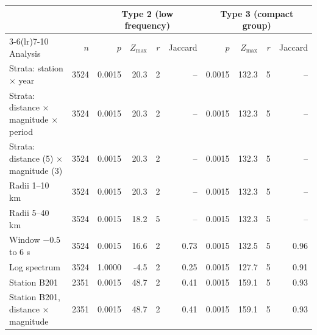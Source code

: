 \begin{tabular}{@{}lrrrrrrrrr@{}}
\toprule
 & & \multicolumn{4}{c}{Type 2 (low frequency)} & \multicolumn{4}{c}{Type 3 (compact group)} \\
\cmidrule(lr){3-6}\cmidrule(lr){7-10}
Analysis & $n$ & $p$ & $Z_{\max}$ & $r$ & Jaccard & $p$ & $Z_{\max}$ & $r$ & Jaccard \\
\midrule
Strata: station $\times$ year & 3524 & 0.0015 & 20.3 & 2 & -- & 0.0015 & 132.3 & 5 & -- \\
Strata: distance $\times$ magnitude $\times$ period & 3524 & 0.0015 & 20.3 & 2 & -- & 0.0015 & 132.3 & 5 & -- \\
Strata: distance (5) $\times$ magnitude (3) & 3524 & 0.0015 & 20.3 & 2 & -- & 0.0015 & 132.3 & 5 & -- \\
Radii 1--10 km & 3524 & 0.0015 & 20.3 & 2 & -- & 0.0015 & 132.3 & 5 & -- \\
Radii 5--40 km & 3524 & 0.0015 & 18.2 & 5 & -- & 0.0015 & 132.3 & 5 & -- \\
Window $-0.5$ to $6$ s & 3524 & 0.0015 & 16.6 & 2 & 0.73 & 0.0015 & 132.5 & 5 & 0.96 \\
Log spectrum & 3524 & 1.0000 & -4.5 & 2 & 0.25 & 0.0015 & 127.7 & 5 & 0.91 \\
Station B201 & 2351 & 0.0015 & 48.7 & 2 & 0.41 & 0.0015 & 159.1 & 5 & 0.93 \\
Station B201, distance $\times$ magnitude & 2351 & 0.0015 & 48.7 & 2 & 0.41 & 0.0015 & 159.1 & 5 & 0.93 \\
\bottomrule
\end{tabular}
